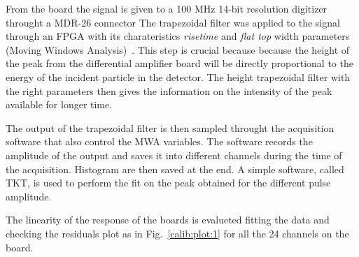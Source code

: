 From the board the signal is given to a 100 MHz 14-bit resolution digitizer throught a MDR-26 connector
The trapezoidal filter was applied to the signal through an FPGA with its charateristics \emph{risetime} and \emph{flat top} width parameters (Moving Windows Analysis)~\cite{salathe}. This step is crucial because because the height of the peak from the differential amplifier board will be directly proportional to the energy of the incident particle in the detector.
The height trapezoidal filter with the right parameters then gives the information on the intensity of the peak available for longer time.


The output of the trapezoidal filter is then sampled throught the acquisition software that also control the MWA variables. The software records the amplitude of the output and saves it into different channels during the time of the acquisition. Histogram are then saved at the end. A simple software, called TKT, is used to perform the fit on the peak obtained for the different pulse amplitude. 

The linearity of the response of the boards is evalueted fitting the data and checking the residuals plot as in Fig.~\ref{calib:plot:1} for all the 24 channels on the board.

